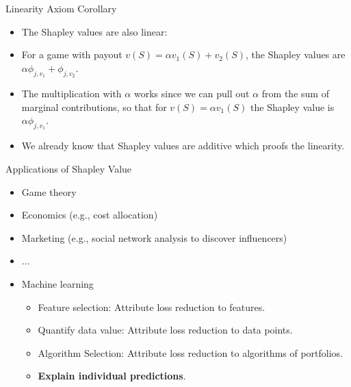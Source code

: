 \documentclass[aspectratio=169]{../latex_main/tntbeamer}  %
\begin{document}
\begin{frame}{Linearity Axiom Corollary}
  \begin{itemize}
  \item The Shapley values are also linear:
  \item For a game with payout $v(S) = \alpha v_1(S) + v_2(S)$, the Shapley values are $\alpha \phi_{j,v_1} + \phi_{j,v_2}$.
  \item The multiplication with $\alpha$ works since we can pull out $\alpha$ from the sum of marginal contributions, so that for $v(S) = \alpha v_1(S)$ the Shapley value is $\alpha \phi_{j,v_1}$.
  \item We already know that Shapley values are additive which proofs the linearity.
  \end{itemize}
\end{frame}



\begin{frame}{Applications of Shapley Value}

  \begin{itemize}
      \item Game theory
      \item Economics (e.g., cost allocation) 
      \item Marketing (e.g., social network analysis to discover influencers) 
      \item ...
      \item Machine learning
       \begin{itemize}
         \item Feature selection: Attribute loss reduction to features. 
         \item Quantify data value: Attribute loss reduction to data points. 
         \item Algorithm Selection: Attribute loss reduction to algorithms of portfolios. 
         \item \textbf{Explain individual predictions}.
       \end{itemize}
  \end{itemize}

\end{frame}
\end{document}

